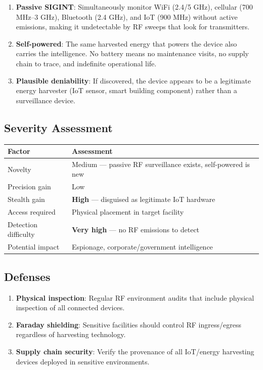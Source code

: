 \documentclass[11pt,a4paper]{article}
\begin{document}
\begin{enumerate}
  \item \textbf{Passive SIGINT}: Simultaneously monitor WiFi
    (2.4/5 GHz), cellular (700 MHz--3 GHz), Bluetooth (2.4 GHz),
    and IoT (900 MHz) without active emissions, making it
    undetectable by RF sweeps that look for transmitters.

  \item \textbf{Self-powered}: The same harvested energy that
    powers the device also carries the intelligence. No battery
    means no maintenance visits, no supply chain to trace, and
    indefinite operational life.

  \item \textbf{Plausible deniability}: If discovered, the device
    appears to be a legitimate energy harvester (IoT sensor, smart
    building component) rather than a surveillance device.
\end{enumerate}

\subsection{Severity Assessment}

\begin{center}
\begin{tabular}{@{}ll@{}}
\toprule
\textbf{Factor} & \textbf{Assessment} \\
\midrule
Novelty & Medium --- passive RF surveillance exists, self-powered is new \\
Precision gain & Low \\
Stealth gain & \textbf{High} --- disguised as legitimate IoT hardware \\
Access required & Physical placement in target facility \\
Detection difficulty & \textbf{Very high} --- no RF emissions to detect \\
Potential impact & Espionage, corporate/government intelligence \\
\bottomrule
\end{tabular}
\end{center}

\subsection{Defenses}

\begin{enumerate}
  \item \textbf{Physical inspection}: Regular RF environment audits
    that include physical inspection of all connected devices.
  \item \textbf{Faraday shielding}: Sensitive facilities should
    control RF ingress/egress regardless of harvesting technology.
  \item \textbf{Supply chain security}: Verify the provenance of
    all IoT/energy harvesting devices deployed in sensitive
    environments.
\end{enumerate}
\end{document}
